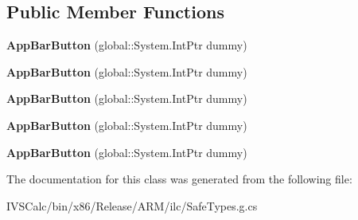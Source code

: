 \subsection*{Public Member Functions}
\begin{DoxyCompactItemize}
\item 
\mbox{\label{class_windows_1_1_u_i_1_1_xaml_1_1_controls_1_1_app_bar_button_aadb1c8d9e04d523a2f745877b5dd666c}} 
{\bfseries App\+Bar\+Button} (global\+::\+System.\+Int\+Ptr dummy)
\item 
\mbox{\label{class_windows_1_1_u_i_1_1_xaml_1_1_controls_1_1_app_bar_button_aadb1c8d9e04d523a2f745877b5dd666c}} 
{\bfseries App\+Bar\+Button} (global\+::\+System.\+Int\+Ptr dummy)
\item 
\mbox{\label{class_windows_1_1_u_i_1_1_xaml_1_1_controls_1_1_app_bar_button_aadb1c8d9e04d523a2f745877b5dd666c}} 
{\bfseries App\+Bar\+Button} (global\+::\+System.\+Int\+Ptr dummy)
\item 
\mbox{\label{class_windows_1_1_u_i_1_1_xaml_1_1_controls_1_1_app_bar_button_aadb1c8d9e04d523a2f745877b5dd666c}} 
{\bfseries App\+Bar\+Button} (global\+::\+System.\+Int\+Ptr dummy)
\item 
\mbox{\label{class_windows_1_1_u_i_1_1_xaml_1_1_controls_1_1_app_bar_button_aadb1c8d9e04d523a2f745877b5dd666c}} 
{\bfseries App\+Bar\+Button} (global\+::\+System.\+Int\+Ptr dummy)
\end{DoxyCompactItemize}


The documentation for this class was generated from the following file\+:\begin{DoxyCompactItemize}
\item 
I\+V\+S\+Calc/bin/x86/\+Release/\+A\+R\+M/ilc/Safe\+Types.\+g.\+cs\end{DoxyCompactItemize}
